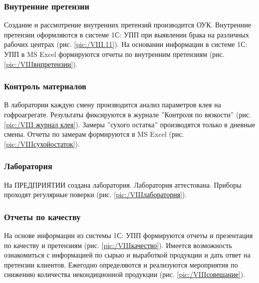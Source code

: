 \subsubsection{Внутренние претензии}

Создание и рассмотрение внутренних претензий производится ОУК. Внутренние претензии оформляются в  системе 1С: УПП при выявлении брака на различных рабочих центрах (рис. \ref{pic:/VIII.11}). На основании информации в системе  1С: УПП в MS Excel формируются отчеты по внутренним претензиям (рис. \ref{pic:/VIIIвнпретензии}).

\subsubsection{Контроль материалов}

В лаборатории каждую  смену производится анализ параметров клея на гофроагрегате. Результаты фиксируются в журнале ''Контроля по вязкости''  (рис. \ref{pic:/VIII журнал клея}). Замеры ''сухого остатка'' производятся только в дневные смены. Отчеты по замерам формируются в MS Excel (рис. \ref{pic:/VIIIсухойостаток}).


\subsubsection{Лаборатория}

На ПРЕДПРИЯТИИ создана лаборатория. Лаборатория аттестована. Приборы проходят регулярные поверки (рис. \ref{pic:/VIIIлаборатория}). 

\subsubsection{Отчеты по качеству}

На основе информации из системы 1С: УПП формируются  отчеты и презентация по качеству и претензиям (рис. \ref{pic:/VIIIкачество}). Имеется возможность ознакомиться с информацией по сырью и выработкой продукции и дать ответ на претензии клиентов. Ежегодно определяются и реализуются мероприятия по снижению количества некондиционной продукции (рис. \ref{pic:/VIIIсовещание}).  
  


